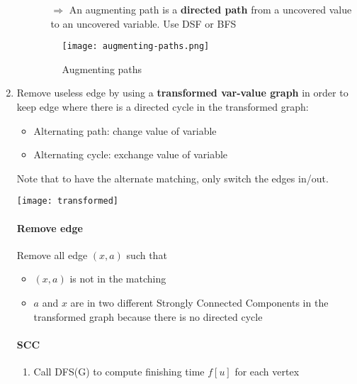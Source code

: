 \begin{enumerate}
\begin{enumerate}
\begin{itemize}
                    \item[$\Rightarrow$] An augmenting path is a \textbf{directed path}
                        from a uncovered value to an uncovered variable.
                        Use DSF or BFS
                \end{itemize}

                \begin{figure}[!h]
                    \centering
                    \texttt{[image: augmenting-paths.png]}
                    \caption{Augmenting paths}
                \end{figure}

        \end{enumerate}

    \item Remove useless edge by using a \textbf{transformed var-value
        graph} in order to keep edge where there is a directed
        cycle in the transformed graph:
        \begin{itemize}
            \item Alternating path: change value of variable
            \item Alternating cycle: exchange value of variable
        \end{itemize}

        Note that to have the alternate matching, only switch the
        edges in/out.

        \begin{center}
            \texttt{[image: transformed]}
        \end{center}

        \paragraph{Remove edge}
        Remove all edge $(x, a)$ such that 
        \begin{itemize}
            \item $(x, a)$ is not in the matching 
            \item $a$ and $x$ are in two different Strongly
                Connected Components in the transformed graph because
                there is no directed cycle 
        \end{itemize}

        \paragraph{SCC}
        \begin{enumerate}
            \item Call DFS(G) to compute finishing time $f[u]$ for each vertex



\end{enumerate}
\end{enumerate}

